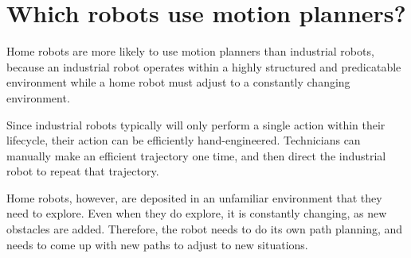 \documentclass{article}
\begin{document}
\section{Which robots use motion planners?}

Home robots are more likely to use motion planners than industrial robots, because an industrial
	robot operates within a highly structured and predicatable environment while a home
	robot must adjust to a constantly changing environment.

Since industrial robots typically will only perform a single action within their lifecycle,
	their action can be efficiently hand-engineered.
Technicians can manually make an efficient trajectory one time, and then direct the industrial
	robot to repeat that trajectory.

Home robots, however, are deposited in an unfamiliar environment that they need to explore.
Even when they do explore, it is constantly changing, as new obstacles are added.
Therefore, the robot needs to do its own path planning, and needs to come up with
	new paths to adjust to new situations.
\end{document}
